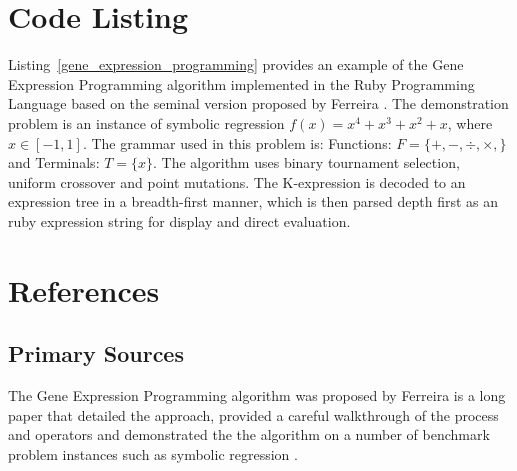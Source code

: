 \documentclass[a4paper, 11pt]{article}
\begin{document}
\section{Code Listing}
\label{sec:code}
Listing~\ref{gene_expression_programming} provides an example of the Gene Expression Programming algorithm implemented in the Ruby Programming Language based on the seminal version proposed by Ferreira \cite{Ferreira2001}.
The demonstration problem is an instance of symbolic regression $f(x)=x^4+x^3+x^2+x$, where $x\in[-1,1]$. The grammar used in this problem is: Functions: $F=\{+,-,\div,\times,\}$ and Terminals: $T=\{x\}$.
The algorithm uses binary tournament selection, uniform crossover and point mutations. The K-expression is decoded to an expression tree in a breadth-first manner, which is then parsed depth first as an ruby expression string for display and direct evaluation.




\section{References}
\label{sec:references}

% 
% 
\subsection{Primary Sources}
The Gene Expression Programming algorithm was proposed by Ferreira is a long paper that detailed the approach, provided a careful walkthrough of the process and operators and demonstrated the the algorithm on a number of benchmark problem instances such as symbolic regression \cite{Ferreira2001}.
\end{document}
